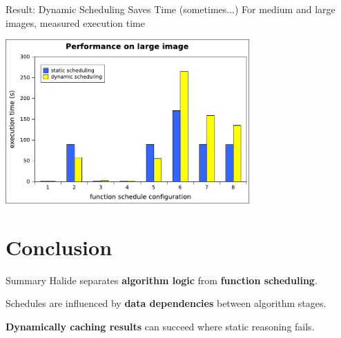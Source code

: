 \documentclass[xcolor=dvipsnames]{beamer}
\begin{document}
\begin{frame}{Result: Dynamic Scheduling Saves Time (sometimes...)}
	For medium and large images, measured execution time

	\begin{center}
	\includegraphics[width=0.7\textwidth]{graphs/large.pdf}
	\end{center}
\end{frame}

\section{Conclusion}


\begin{frame}{Summary}
	Halide separates {\bf algorithm logic} from {\bf function scheduling}.
	\linegap

	Schedules are influenced by {\bf data dependencies} between algorithm stages.
	\linegap

	\textbf{Dynamically caching results} can succeed where static reasoning fails.
\end{frame}
\end{document}
